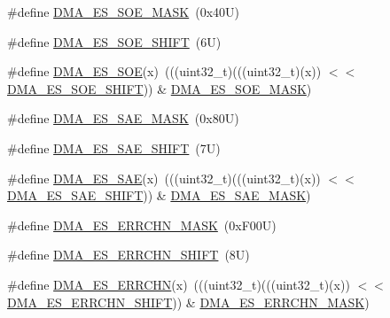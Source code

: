 \begin{DoxyCompactItemize}
\item 
\#define \mbox{\hyperlink{group___d_m_a___register___masks_gad2b80aca760f9cbb20c913eac38db2c7}{D\+M\+A\+\_\+\+E\+S\+\_\+\+S\+O\+E\+\_\+\+M\+A\+SK}}~(0x40\+U)
\item 
\#define \mbox{\hyperlink{group___d_m_a___register___masks_ga3298918e14680c42e624d78d13dac2ba}{D\+M\+A\+\_\+\+E\+S\+\_\+\+S\+O\+E\+\_\+\+S\+H\+I\+FT}}~(6\+U)
\item 
\#define \mbox{\hyperlink{group___d_m_a___register___masks_ga5d4b547d028756b26a5ad9dd42510fda}{D\+M\+A\+\_\+\+E\+S\+\_\+\+S\+OE}}(x)~(((uint32\+\_\+t)(((uint32\+\_\+t)(x)) $<$$<$ \mbox{\hyperlink{group___d_m_a___register___masks_ga3298918e14680c42e624d78d13dac2ba}{D\+M\+A\+\_\+\+E\+S\+\_\+\+S\+O\+E\+\_\+\+S\+H\+I\+FT}})) \& \mbox{\hyperlink{group___d_m_a___register___masks_gad2b80aca760f9cbb20c913eac38db2c7}{D\+M\+A\+\_\+\+E\+S\+\_\+\+S\+O\+E\+\_\+\+M\+A\+SK}})
\item 
\#define \mbox{\hyperlink{group___d_m_a___register___masks_gac5a0c75aa964d00ff152c804b9100701}{D\+M\+A\+\_\+\+E\+S\+\_\+\+S\+A\+E\+\_\+\+M\+A\+SK}}~(0x80\+U)
\item 
\#define \mbox{\hyperlink{group___d_m_a___register___masks_gab8fcc55b025406188612ca7ea6fd4eb7}{D\+M\+A\+\_\+\+E\+S\+\_\+\+S\+A\+E\+\_\+\+S\+H\+I\+FT}}~(7\+U)
\item 
\#define \mbox{\hyperlink{group___d_m_a___register___masks_ga21615c728b2d565eefe3eb83b057636d}{D\+M\+A\+\_\+\+E\+S\+\_\+\+S\+AE}}(x)~(((uint32\+\_\+t)(((uint32\+\_\+t)(x)) $<$$<$ \mbox{\hyperlink{group___d_m_a___register___masks_gab8fcc55b025406188612ca7ea6fd4eb7}{D\+M\+A\+\_\+\+E\+S\+\_\+\+S\+A\+E\+\_\+\+S\+H\+I\+FT}})) \& \mbox{\hyperlink{group___d_m_a___register___masks_gac5a0c75aa964d00ff152c804b9100701}{D\+M\+A\+\_\+\+E\+S\+\_\+\+S\+A\+E\+\_\+\+M\+A\+SK}})
\item 
\#define \mbox{\hyperlink{group___d_m_a___register___masks_ga1706839a3ec91f2cd194526d1d5fc60e}{D\+M\+A\+\_\+\+E\+S\+\_\+\+E\+R\+R\+C\+H\+N\+\_\+\+M\+A\+SK}}~(0x\+F00\+U)
\item 
\#define \mbox{\hyperlink{group___d_m_a___register___masks_ga67f75f97e4bc971fa4044115d2831ede}{D\+M\+A\+\_\+\+E\+S\+\_\+\+E\+R\+R\+C\+H\+N\+\_\+\+S\+H\+I\+FT}}~(8\+U)
\item 
\#define \mbox{\hyperlink{group___d_m_a___register___masks_ga8110274a770ce169f7f5f3136b55431a}{D\+M\+A\+\_\+\+E\+S\+\_\+\+E\+R\+R\+C\+HN}}(x)~(((uint32\+\_\+t)(((uint32\+\_\+t)(x)) $<$$<$ \mbox{\hyperlink{group___d_m_a___register___masks_ga67f75f97e4bc971fa4044115d2831ede}{D\+M\+A\+\_\+\+E\+S\+\_\+\+E\+R\+R\+C\+H\+N\+\_\+\+S\+H\+I\+FT}})) \& \mbox{\hyperlink{group___d_m_a___register___masks_ga1706839a3ec91f2cd194526d1d5fc60e}{D\+M\+A\+\_\+\+E\+S\+\_\+\+E\+R\+R\+C\+H\+N\+\_\+\+M\+A\+SK}})
$$
\end{DoxyCompactItemize}
